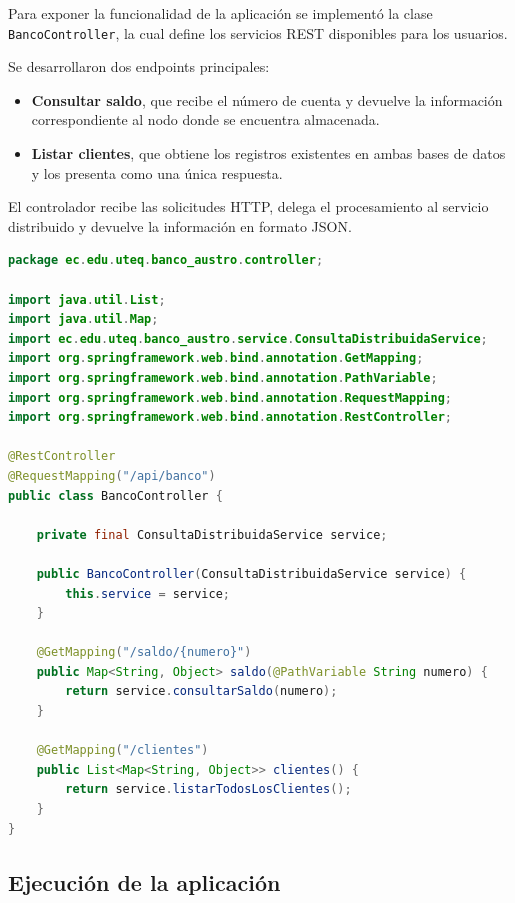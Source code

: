 \documentclass[11pt,a4paper]{article}
\begin{document}
Para exponer la funcionalidad de la aplicación se implementó la clase \texttt{BancoController}, la cual define los servicios REST disponibles para los usuarios.

Se desarrollaron dos endpoints principales:

\begin{itemize}[leftmargin=*]
    \item \textbf{Consultar saldo}, que recibe el número de cuenta y devuelve la información correspondiente al nodo donde se encuentra almacenada.
    \item \textbf{Listar clientes}, que obtiene los registros existentes en ambas bases de datos y los presenta como una única respuesta.
\end{itemize}

El controlador recibe las solicitudes HTTP, delega el procesamiento al servicio distribuido y devuelve la información en formato JSON.

\begin{lstlisting}[language=Java, caption={BancoController.java}]
package ec.edu.uteq.banco_austro.controller;

import java.util.List;
import java.util.Map;
import ec.edu.uteq.banco_austro.service.ConsultaDistribuidaService;
import org.springframework.web.bind.annotation.GetMapping;
import org.springframework.web.bind.annotation.PathVariable;
import org.springframework.web.bind.annotation.RequestMapping;
import org.springframework.web.bind.annotation.RestController;

@RestController
@RequestMapping("/api/banco")
public class BancoController {

    private final ConsultaDistribuidaService service;

    public BancoController(ConsultaDistribuidaService service) {
        this.service = service;
    }

    @GetMapping("/saldo/{numero}")
    public Map<String, Object> saldo(@PathVariable String numero) {
        return service.consultarSaldo(numero);
    }

    @GetMapping("/clientes")
    public List<Map<String, Object>> clientes() {
        return service.listarTodosLosClientes();
    }
}
\end{lstlisting}

\FloatBarrier
\subsection{Ejecución de la aplicación}
\end{document}
